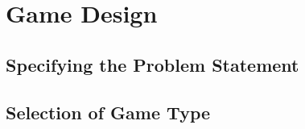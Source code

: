\chapter{Game Design}


\section{Specifying the Problem Statement}\label{sec:specifyingtheproblemstatement}

\section{Selection of Game Type}
